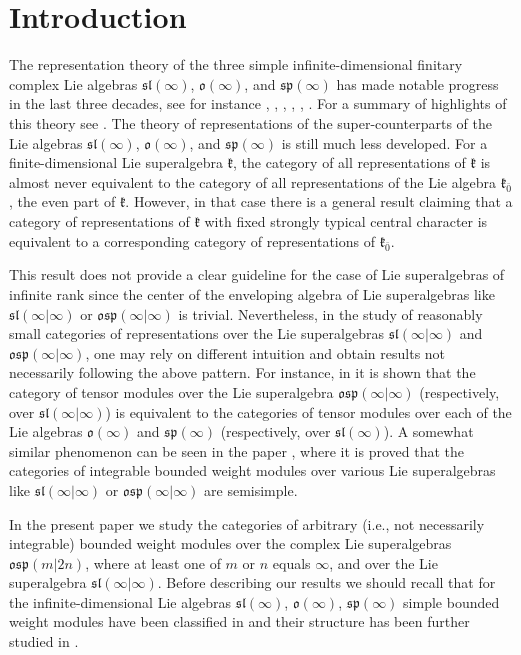 \documentclass[12pt]{amsart}
\makeatletter
\def\@putname#1#2#3#4{\def\@@ref{#3}\let\old@bf\bf
        \def\bf##1{\old@bf\if?\noexpand##1?{#4}\else##1\fi}%
	#1{#2}%
        \let\bf\old@bf}
\def\@putname#1#2#3#4{\def\@@ref{#3}\let\old@bf\bf	%
	\let\old@reset@font\reset@font			%
        \def\bf##1{\old@bf\if?\noexpand##1?{#4}\else##1\fi}%
	\def\reset@font##1##2{\old@reset@font##1\if?\noexpand##2?{#4}\else##2\fi}#1{#2}%
        \let\bf\old@bf\let\reset@font\old@reset@font}
\let\my@cite=\cite
\def\cite#1{\@putname\my@cite{#1}{\@citeb}{\tiny\rm\@@ref}}
\theoremstyle{plain} %
\numberwithin{equation}{section}
\theoremstyle{definition}
\theoremstyle{remark}
\theoremstyle{plain} %
\renewcommand{\sp}{\mathfrak{sp}}
\renewcommand{\sl}{\mathfrak{sl}}
\newcommand{\osp}{\mathfrak{osp}}
\makeatother
\begin{document}
\section*{Introduction}
The representation theory of the three simple infinite-dimensional finitary complex Lie algebras  $\sl (\infty)$, $\mathfrak o (\infty)$, and $\sp (\infty)$ has made notable progress in the last three decades, see for instance  \cite{DPS},  \cite{DP}, \cite{PSer1}, \cite{PSer2}, \cite{PStyr}, \cite{SS}. For a  summary of highlights of this theory  see  \cite{PH}. The theory of representations of the super-counterparts of the Lie algebras $\sl (\infty)$, $\mathfrak o (\infty)$, and $\sp (\infty)$ is still much less developed. For a finite-dimensional Lie superalgebra $\mathfrak k$, the category of all representations of $\mathfrak k$ is almost never equivalent to the category of all representations of the Lie algebra $\mathfrak k_{\bar{0}}$, the even part  of  $\mathfrak k$. However, in that case  there is a general result claiming that 
a category of representations of $\mathfrak k$ with fixed strongly typical central character is equivalent to a corresponding category of representations of $\mathfrak k_{\bar{0}}$.

 This result does not provide a clear guideline for the case of Lie superalgebras of infinite rank  since  the center of the enveloping algebra of  Lie superalgebras like $\sl (\infty | \infty)$ or $\osp (\infty | \infty)$ is trivial. Nevertheless, in the study of  reasonably small categories of representations over the Lie superalgebras  $\sl (\infty | \infty)$ and $\osp (\infty | \infty)$, one may rely on different intuition and obtain results not necessarily following the above pattern. For instance, in \cite{S} it is shown that the category of tensor modules  over the Lie superalgebra  $\osp (\infty | \infty)$ (respectively, over  $\sl (\infty | \infty)$) is  equivalent to the categories of tensor modules  over each of the Lie algebras $\mathfrak o (\infty)$ and $\sp (\infty)$ (respectively, over $\sl (\infty)$).  A somewhat similar phenomenon can be seen in the paper \cite{CP}, where it is proved that the categories of integrable bounded weight  modules over various Lie superalgebras like $\sl (\infty | \infty)$ or $\osp (\infty | \infty)$ are semisimple.

In the present paper we study the categories of arbitrary (i.e., not necessarily  integrable) bounded weight modules over the complex Lie superalgebras $\osp (m | 2n)$,  where at least one of $m$ or $n$ equals $\infty$, and over the Lie superalgebra $\sl (\infty | \infty)$. Before describing our results we should recall that for the infinite-dimensional Lie algebras $\mathfrak{sl} (\infty)$, $\mathfrak o (\infty)$, $\mathfrak{sp}(\infty)$ simple bounded weight modules have been classified in \cite{GrP} and their structure has been further studied in \cite{C}.
\end{document}
